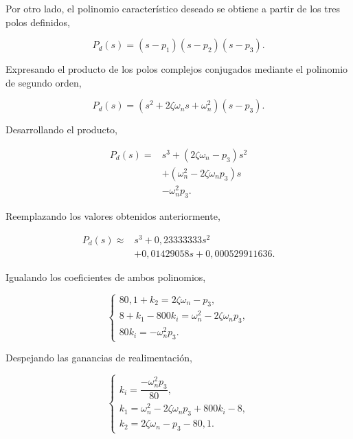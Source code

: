 \documentclass[10pt]{article}
\begin{document}
Por otro lado, el polinomio característico deseado
se obtiene a partir de los tres polos definidos,

\begin{equation}
    P_d(s)=(s-p_1)(s-p_2)(s-p_3).
\end{equation}

Expresando el producto de los polos complejos
conjugados mediante el polinomio de segundo orden,

\begin{equation}
    P_d(s)=
    (s^2+2\zeta\omega_ns+\omega_n^2)(s-p_3).
\end{equation}

Desarrollando el producto,

\begin{equation}
    \begin{aligned}
        P_d(s)={}&s^3+(2\zeta\omega_n-p_3)s^2\\
        &+(\omega_n^2-2\zeta\omega_np_3)s\\
        &-\omega_n^2p_3.
    \end{aligned}
\end{equation}

Reemplazando los valores obtenidos anteriormente,

\begin{equation}
    \begin{aligned}
        P_d(s)\approx{}&
        s^3+0{,}23333333s^2\\
        &+0{,}01429058s
        +0{,}000529911636.
    \end{aligned}
\end{equation}

Igualando los coeficientes de ambos polinomios,

\begin{equation}
    \begin{cases}
        80{,}1+k_2=2\zeta\omega_n-p_3,\\
        8+k_1-800k_i=\omega_n^2-2\zeta\omega_np_3,\\
        80k_i=-\omega_n^2p_3.
    \end{cases}
\end{equation}

Despejando las ganancias de realimentación,

\begin{equation}
    \begin{cases}
        k_i=\dfrac{-\omega_n^2p_3}{80},\\[6pt]
        k_1=\omega_n^2-2\zeta\omega_np_3+800k_i-8,\\
        k_2=2\zeta\omega_n-p_3-80{,}1.
    \end{cases}
\end{equation}
\end{document}
